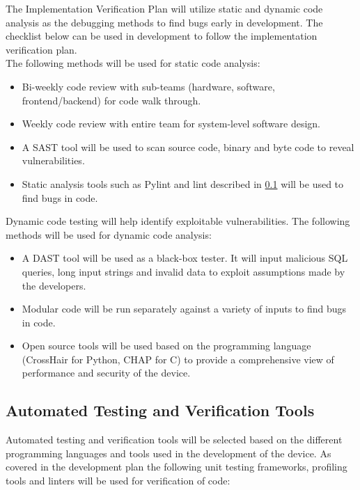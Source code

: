 \documentclass[12pt, titlepage]{article}
\begin{document}
The Implementation Verification Plan will utilize static and dynamic code analysis as the debugging methods to find bugs early in development. The checklist below can be used in development to follow the implementation verification plan.\\
The following methods will be used for static code analysis:
\begin{itemize}
  \item Bi-weekly code review with sub-teams (hardware, software, frontend/backend) for code walk through.
  \item Weekly code review with entire team for system-level software design.
  \item A SAST tool will be used to scan source code, binary and byte code to reveal vulnerabilities.
  \item Static analysis tools such as Pylint and lint described in \ref{Automation} will be used to find bugs in code.
\end{itemize}
\newpage
Dynamic code testing will help identify exploitable vulnerabilities. The following methods will be used for dynamic code analysis:
\begin{itemize}
  \item A DAST tool will be used as a black-box tester. It will input malicious SQL queries, long input strings and invalid data to exploit assumptions made by the developers.
  \item Modular code will  be run separately against a variety of inputs to find bugs in code.
  \item Open source tools will be used based on the programming language (CrossHair for Python, CHAP for C) to provide a comprehensive view of performance and security of the device.
\end{itemize}


\subsection{Automated Testing and Verification Tools}\label{Automation}

Automated testing and verification tools will be selected based on the different programming languages and tools used in the development of the device. As covered in the development plan \cite{Development_Plan} the following unit testing frameworks, profiling tools and linters will be used for verification of code:
\end{document}
